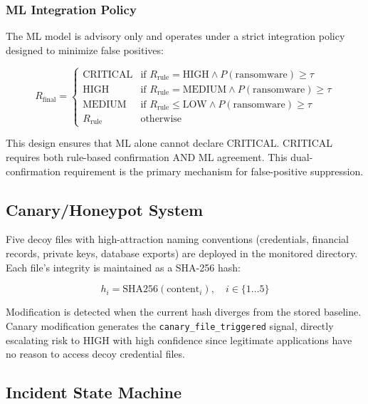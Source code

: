 \documentclass[conference]{IEEEtran}
\begin{document}
\subsubsection{ML Integration Policy}
The ML model is advisory only and operates under a strict
integration policy designed to minimize false positives:

\begin{equation}
R_{\text{final}} = \begin{cases}
\text{CRITICAL} & \text{if } R_{\text{rule}} = \text{HIGH} \wedge
                  P(\text{ransomware}) \geq \tau \\
\text{HIGH} & \text{if } R_{\text{rule}} = \text{MEDIUM} \wedge
              P(\text{ransomware}) \geq \tau \\
\text{MEDIUM} & \text{if } R_{\text{rule}} \leq \text{LOW} \wedge
               P(\text{ransomware}) \geq \tau \\
R_{\text{rule}} & \text{otherwise}
\end{cases}
\end{equation}

This design ensures that ML alone cannot declare CRITICAL.
CRITICAL requires both rule-based confirmation AND ML
agreement. This dual-confirmation requirement is the primary
mechanism for false-positive suppression.

\subsection{Canary/Honeypot System}

Five decoy files with high-attraction naming conventions
(credentials, financial records, private keys, database
exports) are deployed in the monitored directory. Each file's
integrity is maintained as a SHA-256 hash:

\begin{equation}
h_i = \text{SHA256}(\text{content}_i), \quad i \in \{1 \ldots 5\}
\end{equation}

Modification is detected when the current hash diverges from
the stored baseline. Canary modification generates the
\texttt{canary\_file\_triggered} signal, directly escalating
risk to HIGH with high confidence since legitimate applications
have no reason to access decoy credential files.

\subsection{Incident State Machine}
\end{document}

